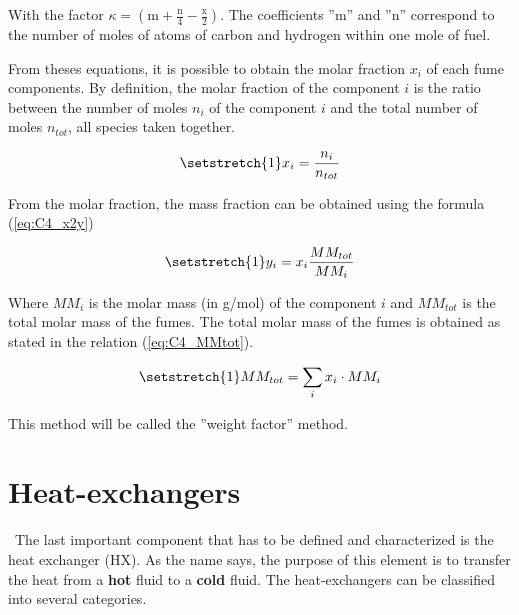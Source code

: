 With the factor \(\kappa = (\text{m}+\frac{\text{n}}{4}-\frac{\text{x}}{2})\). The coefficients ''m'' and ''n'' correspond to the number of moles of atoms of carbon and hydrogen within one mole of fuel.

From theses equations, it is possible to obtain the molar fraction \(x_i\) of each fume components. By definition, the molar fraction of the component \(i\) is the ratio between the number of moles \(n_i\) of the component \(i\) and the total number of moles \(n_{tot}\), all species taken together.

\begin{equation*}
    \setstretch{1}
    x_i = \frac{n_i}{n_{tot}}
\end{equation*}

From the molar fraction, the mass fraction can be obtained using the formula (\ref{eq:C4_x2y})

\begin{equation}
    \setstretch{1}
    y_i = x_i\frac{MM_{tot}}{MM_i} \label{eq:C4_x2y}
\end{equation}

Where \(MM_i\) is the molar mass (in g/mol) of the component \(i\) and \(MM_{tot}\) is the total molar mass of the fumes. The total molar mass of the fumes is obtained as stated in the relation (\ref{eq:C4_MMtot}).

\begin{equation}
    \setstretch{1}
    MM_{tot} = \sum_i x_i\cdot MM_i \label{eq:C4_MMtot}
\end{equation}

This method will be called the ''weight factor'' method.

\section{Heat-exchangers}
\quad\ The last important component that has to be defined and characterized is the heat exchanger (HX). As the name says, the purpose of this element is to transfer the heat from a \textbf{hot} fluid to a \textbf{cold} fluid. The heat-exchangers can be classified into several categories\cite{Ngendakumana2018}.

